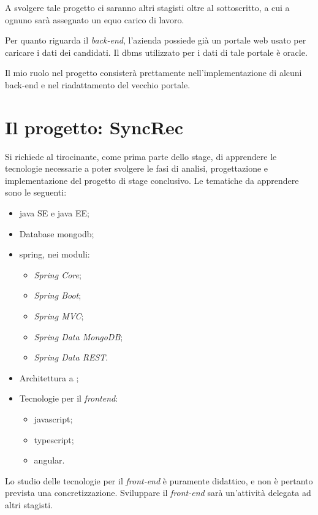 A svolgere tale progetto ci saranno altri stagisti oltre al sottoscritto, a cui a ognuno sarà assegnato un equo carico di lavoro.

Per quanto riguarda il \textit{back-end}, l'azienda possiede già un portale web usato per caricare i dati dei candidati. Il \gls{dbms} utilizzato per i dati di tale portale è \gls{oracle}\gloss.

Il mio ruolo nel progetto consisterà prettamente nell'implementazione di alcuni  back-end e nel riadattamento del vecchio portale.


\section{Il progetto: SyncRec}

Si richiede al tirocinante, come prima parte dello stage, di apprendere le tecnologie necessarie a poter svolgere le fasi di analisi, progettazione e implementazione del progetto di stage conclusivo.
Le tematiche da apprendere sono le seguenti:
\begin{itemize}
	\item \gls{java} SE e \gls{java} EE;
	\item Database \gls{mongodb};
	\item \gls{spring}\gloss, nei moduli:
	\begin{itemize}[noitemsep]
		\item \textit{Spring Core};
		\item \textit{Spring Boot};
		\item \textit{Spring MVC};
		\item \textit{Spring Data MongoDB};
		\item \textit{Spring Data REST}.
	\end{itemize}
	\item Architettura a ;
	\item Tecnologie per il \textit{frontend}:
	\begin{itemize}[noitemsep]
		\item \gls{javascript}\gloss;
		\item \gls{typescript}\gloss;
		\item \gls{angular}.
	\end{itemize}
\end{itemize}

Lo studio delle tecnologie per il \textit{front-end} è puramente didattico, e non è pertanto prevista una concretizzazione.
Sviluppare il \textit{front-end} sarà un'attività delegata ad altri stagisti.

